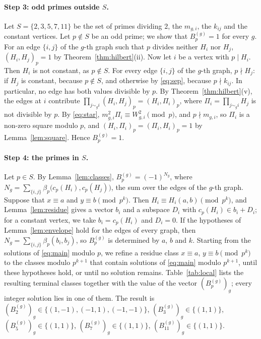 \documentclass[11pt]{article}
\begin{document}
\paragraph{Step 3: odd primes outside $S$.} Let $S=\{2,3,5,7,11\}$ be the set of primes dividing $2$, the $m_{g,i}$, the $k_{ij}$ and the constant vertices. Let $p\notin S$ be an odd prime; we show that $B^{(g)}_p=1$ for every $g$. For an edge $\{i,j\}$ of the $g$-th graph such that $p$ divides neither $H_i$ nor $H_j$, $(H_i,H_j)_p=1$ by Theorem~\ref{thm:hilbert}(ii). Now let $i$ be a vertex with $p\mid H_i$. Then $H_i$ is not constant, as $p\notin S$. For every edge $\{i,j\}$ of the $g$-th graph, $p\nmid H_j$: if $H_j$ is constant, because $p\notin S$, and otherwise by \eqref{eq:sep}, because $p\nmid k_{ij}$. In particular, no edge has both values divisible by $p$. By Theorem~\ref{thm:hilbert}(v), the edges at $i$ contribute $\prod_{j\sim_g i}(H_i,H_j)_p=(H_i,\Pi_i)_p$, where $\Pi_i=\prod_{j\sim_g i}H_j$ is not divisible by $p$. By \eqref{eq:star}, $m_{g,i}^2\Pi_i\equiv W_{g,i}^2\pmod p$, and $p\nmid m_{g,i}$, so $\Pi_i$ is a non-zero square modulo $p$, and $(H_i,\Pi_i)_p=(\Pi_i,H_i)_p=1$ by Lemma~\ref{lem:square}. Hence $B^{(g)}_p=1$.

\paragraph{Step 4: the primes in $S$.} Let $p\in S$. By Lemma~\ref{lem:classes}, $B^{(g)}_p=(-1)^{N_g}$, where $N_g=\sum_{\{i,j\}}\beta_p\bigl(c_p(H_i),c_p(H_j)\bigr)$, the sum over the edges of the $g$-th graph. Suppose that $x\equiv a$ and $y\equiv b\pmod{p^k}$. Then $H_i\equiv H_i(a,b)\pmod{p^k}$, and Lemma~\ref{lem:residue} gives a vector $b_i$ and a subspace $D_i$ with $c_p(H_i)\in b_i+D_i$; for a constant vertex, we take $b_i=c_p(H_i)$ and $D_i=0$. If the hypotheses of Lemma~\ref{lem:envelope} hold for the edges of every graph, then $N_g=\sum_{\{i,j\}}\beta_p(b_i,b_j)$, so $B^{(g)}_p$ is determined by $a$, $b$ and $k$. Starting from the solutions of \eqref{eq:main} modulo $p$, we refine a residue class $x\equiv a$, $y\equiv b\pmod{p^k}$ to the classes modulo $p^{k+1}$ that contain solutions of \eqref{eq:main} modulo $p^{k+1}$, until these hypotheses hold, or until no solution remains. Table~\ref{tab:local} lists the resulting terminal classes together with the value of the vector $(B^{(g)}_p)_g$; every integer solution lies in one of them. The result is $(B^{(g)}_{2})_g\in\{(1,-1),\allowbreak (-1,1),\allowbreak (-1,-1)\}$, $(B^{(g)}_{3})_g\in\{(1,1)\}$, $(B^{(g)}_{5})_g\in\{(1,1)\}$, $(B^{(g)}_{7})_g\in\{(1,1)\}$, $(B^{(g)}_{11})_g\in\{(1,1)\}$.
\end{document}
